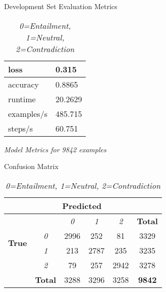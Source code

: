 \documentclass[twocolumn]{article}
\begin{document}
\begin{table}[]
\caption{Development Set Evaluation Metrics}
\centering
\begin{tabular}{|l|l|}
\hline
loss       & 0.315   \\ \hline
accuracy   & 0.8865  \\ \hline
runtime    & 20.2629 \\ \hline
examples/s & 485.715 \\ \hline
steps/s    & 60.751  \\ \hline
\end{tabular}
\caption*{\textit{Model Metrics for 9842 examples}}

\caption{Confusion Matrix}
\begin{tabular}{|c|cccc|c|}
\hline
\multicolumn{1}{|l|}{}         & \multicolumn{4}{c|}{\textbf{Predicted}}                                                                              & \multicolumn{1}{l|}{} \\ \hline
\multirow{4}{*}{\textbf{True}} & \multicolumn{1}{l|}{}               & \multicolumn{1}{c|}{\textit{0}} & \multicolumn{1}{c|}{\textit{1}} & \textit{2} & \textbf{Total}        \\ \cline{2-6} 
                               & \multicolumn{1}{c|}{\textit{0}}     & \multicolumn{1}{c|}{2996}       & \multicolumn{1}{c|}{252}        & 81         & 3329                  \\ \cline{2-6} 
                               & \multicolumn{1}{c|}{\textit{1}}     & \multicolumn{1}{c|}{213}        & \multicolumn{1}{c|}{2787}       & 235        & 3235                  \\ \cline{2-6} 
                               & \multicolumn{1}{c|}{\textit{2}}     & \multicolumn{1}{c|}{79}         & \multicolumn{1}{c|}{257}        & 2942       & 3278                  \\ \hline
\multicolumn{1}{|l|}{}         & \multicolumn{1}{c|}{\textbf{Total}} & \multicolumn{1}{c|}{3288}       & \multicolumn{1}{c|}{3296}       & 3258       & \textbf{9842}         \\ \hline
\end{tabular}
\caption*{\textit{ 0=Entailment, 1=Neutral, 2=Contradiction }}


\end{table}
\end{document}

